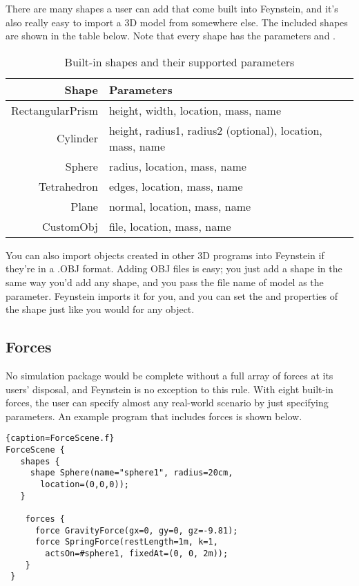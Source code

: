 There are many shapes a user can add that come built into Feynstein,
and it's also really easy to import a 3D model from somewhere
else. The included shapes are shown in the table below. Note that
every shape has the parameters  and .

\begin{table}\centering
  \begin{tabular}{r|l}
    \textbf{Shape} & \textbf{Parameters} \\ \hline
    RectangularPrism & height, width, location, mass, name \\
    Cylinder & height, radius1, radius2 (optional), location, mass, name \\
    Sphere & radius, location, mass, name \\
    Tetrahedron & edges, location, mass, name \\
    Plane & normal, location, mass, name \\
    CustomObj & file, location, mass, name \\
  \end{tabular} 
\caption{Built-in shapes and their supported parameters}
\label{tab:shapestut}
\end{table}

You can also import objects created in other 3D programs into
Feynstein if they're in a .OBJ format. Adding OBJ files is easy; you
just add a  shape in the same way you'd add any shape, and
you pass the file name of model as the  parameter. Feynstein
imports it for you, and you can set the  and 
properties of the shape just like you would for any object.

\subsection{Forces}
No simulation package would be complete without a full array of forces
at its users' disposal, and Feynstein is no exception to this
rule. With eight built-in forces, the user can specify almost any
real-world scenario by just specifying parameters. An example program
that includes forces is shown below.

\begin{lstlisting}{caption=ForceScene.f}
ForceScene {
   shapes {
     shape Sphere(name="sphere1", radius=20cm, 
       location=(0,0,0));
   }

    forces {
      force GravityForce(gx=0, gy=0, gz=-9.81);
      force SpringForce(restLength=1m, k=1, 
        actsOn=#sphere1, fixedAt=(0, 0, 2m));
    }
 }
\end{lstlisting}

